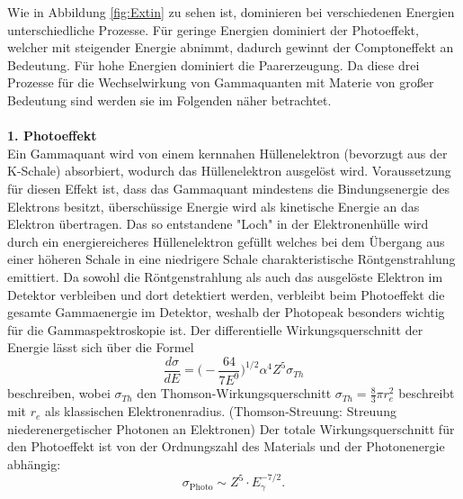 Wie in Abbildung \ref{fig:Extin} zu sehen ist, dominieren bei verschiedenen Energien
unterschiedliche Prozesse. Für geringe Energien dominiert der Photoeffekt, welcher mit
steigender Energie abnimmt, dadurch gewinnt der Comptoneffekt an Bedeutung. Für hohe
Energien dominiert die Paarerzeugung.
Da diese drei Prozesse für die Wechselwirkung von Gammaquanten mit Materie von großer Bedeutung sind
werden sie im Folgenden näher betrachtet.
\cite{Springer3}
\\
\\
\textbf{1. Photoeffekt}\\
Ein Gammaquant wird von einem kernnahen Hüllenelektron (bevorzugt aus der K-Schale) absorbiert,
wodurch das Hüllenelektron ausgelöst wird. Voraussetzung für diesen Effekt ist, dass das Gammaquant
mindestens die Bindungsenergie des Elektrons besitzt, überschüssige Energie wird als kinetische
Energie an das Elektron übertragen.
Das so entstandene "Loch" in der Elektronenhülle wird durch ein energiereicheres Hüllenelektron
gefüllt welches bei dem Übergang aus einer höheren Schale in eine niedrigere Schale
charakteristische Röntgenstrahlung emittiert.
Da sowohl die Röntgenstrahlung als auch das ausgelöste Elektron im Detektor verbleiben und
dort detektiert werden, verbleibt beim Photoeffekt die gesamte Gammaenergie im Detektor, weshalb
der Photopeak besonders wichtig für die Gammaspektroskopie ist.
Der differentielle Wirkungsquerschnitt der Energie lässt sich über die Formel
\begin{equation}
  \frac{d \sigma}{d E} = \bigg(-\frac{64}{7E^{9}}\bigg)^{1/2}\alpha^4 Z^5\sigma_{Th}
  \label{eqn:diffPhoto}
\end{equation}
beschreiben, wobei $\sigma_{Th}$ den Thomson-Wirkungsquerschnitt $\sigma_{Th} = \frac{8}{3}\pi r_{e}^2$
beschreibt mit $r_e$ als klassischen Elektronenradius.
(Thomson-Streuung: Streuung niederenergetischer Photonen an Elektronen) \cite{Springer3}
Der totale Wirkungsquerschnitt für den Photoeffekt ist von der Ordnungszahl des Materials
und der Photonenergie abhängig:
\begin{equation}
  \sigma_{\text{Photo}}\sim Z^5\cdot E_{\gamma}^{-7/2}.
  \label{eqn:WQphoto}
\end{equation}
\cite{Karlsruhe}
\\
\\

